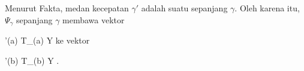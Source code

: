 Menurut
Fakta,
medan kecepatan $\gamma'$ adalah suatu
sepanjang $\gamma$. Oleh karena itu,
$\Psi_\gamma$ sepanjang $\gamma$ membawa vektor

\mavergleichskette
{\vergleichskette
{ \gamma'(a)
}
{ \in }{  T_{\gamma(a)} Y
}
{  }{
}
{    }{
}
{   }{
}
}
{}{}{}
ke vektor

\mavergleichskette
{\vergleichskette
{ \gamma'(b)
}
{ \in }{  T_{\gamma(b)} Y
}
{  }{
}
{    }{
}
{   }{
}
}
{}{}{.}
